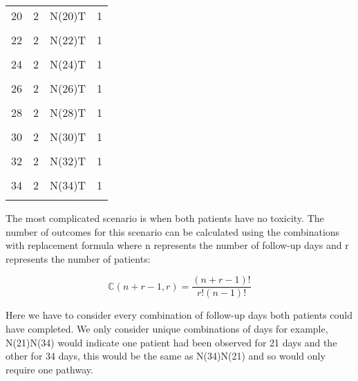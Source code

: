 \begin{table}[H]
{\begin{tabular}[t]{cccc}
			20 & 2 & N(20)T & 1\\
			\cellcolor{gray!6}{21} & \cellcolor{gray!6}{2} & \cellcolor{gray!6}{N(21)T} & \cellcolor{gray!6}{1}\\
			22 & 2 & N(22)T & 1\\
			\cellcolor{gray!6}{23} & \cellcolor{gray!6}{2} & \cellcolor{gray!6}{N(23)T} & \cellcolor{gray!6}{1}\\
			24 & 2 & N(24)T & 1\\
			\cellcolor{gray!6}{25} & \cellcolor{gray!6}{2} & \cellcolor{gray!6}{N(25)T} & \cellcolor{gray!6}{1}\\
			26 & 2 & N(26)T & 1\\
			\cellcolor{gray!6}{27} & \cellcolor{gray!6}{2} & \cellcolor{gray!6}{N(27)T} & \cellcolor{gray!6}{1}\\
			28 & 2 & N(28)T & 1\\
			\cellcolor{gray!6}{29} & \cellcolor{gray!6}{2} & \cellcolor{gray!6}{N(29)T} & \cellcolor{gray!6}{1}\\
			30 & 2 & N(30)T & 1\\
			\cellcolor{gray!6}{31} & \cellcolor{gray!6}{2} & \cellcolor{gray!6}{N(31)T} & \cellcolor{gray!6}{1}\\
			32 & 2 & N(32)T & 1\\
			\cellcolor{gray!6}{33} & \cellcolor{gray!6}{2} & \cellcolor{gray!6}{N(33)T} & \cellcolor{gray!6}{1}\\
			34 & 2 & N(34)T & 1\\
			\cellcolor{gray!6}{35} & \cellcolor{gray!6}{2} & \cellcolor{gray!6}{NT} & \cellcolor{gray!6}{1}\\
			\bottomrule
	\end{tabular}}
\end{table}

The most complicated scenario is when both patients have no toxicity. The number of outcomes for this scenario can be calculated using the combinations with replacement formula where n represents the number of follow-up days and r represents the number of patients: 

\begin{equation}
	\label{eq_tite-dtp:combinations}
	\mathbb{C}(n+r-1,r) = \frac{(n+r-1)!}{r!(n-1)!}
\end{equation}

Here we have to consider every combination of follow-up days both patients could have completed. We only consider unique combinations of days for example, N(21)N(34) would indicate one patient had been observed for 21 days and the other for 34 days, this would be the same as N(34)N(21) and so would only require one pathway. 

